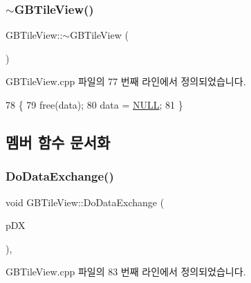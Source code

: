 \subsubsection{\texorpdfstring{$\sim$\+G\+B\+Tile\+View()}{~GBTileView()}}
{\footnotesize\ttfamily G\+B\+Tile\+View\+::$\sim$\+G\+B\+Tile\+View (\begin{DoxyParamCaption}{ }\end{DoxyParamCaption})\hspace{0.3cm}{\ttfamily [virtual]}}



G\+B\+Tile\+View.\+cpp 파일의 77 번째 라인에서 정의되었습니다.


\begin{DoxyCode}
78 \{
79   free(data);
80   data = \mbox{\hyperlink{getopt1_8c_a070d2ce7b6bb7e5c05602aa8c308d0c4}{NULL}};
81 \}
\end{DoxyCode}


\subsection{멤버 함수 문서화}
\mbox{\label{class_g_b_tile_view_a6f6a323365040d7675c035b26fdecd9f}} 
\subsubsection{\texorpdfstring{Do\+Data\+Exchange()}{DoDataExchange()}}
{\footnotesize\ttfamily void G\+B\+Tile\+View\+::\+Do\+Data\+Exchange (\begin{DoxyParamCaption}\item[{C\+Data\+Exchange $\ast$}]{p\+DX }\end{DoxyParamCaption})\hspace{0.3cm}{\ttfamily [protected]}, {\ttfamily [virtual]}}



G\+B\+Tile\+View.\+cpp 파일의 83 번째 라인에서 정의되었습니다.


